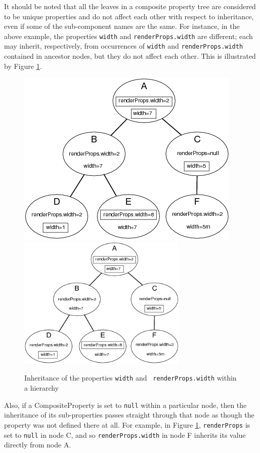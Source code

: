 \documentclass{article}
\begin{document}
It should be noted that all the leaves in a composite property tree
are considered to be unique properties and do not affect each other
with respect to inheritance, even if some of the sub-component names
are the same. For instance, in the above example, the properties 
{\tt width} and {\tt renderProps.width} are different; each may inherit,
respectively, from occurrences of {\tt width} and 
{\tt renderProps.width} contained in ancestor nodes, but they do not affect
each other. This is illustrated by Figure \ref{compositesFig}.

\begin{figure}
\begin{center}
\iflatexml
\includegraphics[]{images/composites}
\else
\includegraphics[height=2.5in]{images/composites}
\fi
\end{center}
\caption{Inheritance of the properties {\tt width} and {\tt
renderProps.width} within a hierarchy}%
\label{compositesFig}
\end{figure}

Also, if a CompositeProperty is set to {\tt null} within a particular
node, then the inheritance of its sub-properties passes straight
through that node as though the property was not defined there at
all. For example, in Figure \ref{compositesFig}, {\tt renderProps} is
set to {\tt null} in node C, and so {\tt renderProps.width} in node F
inherits its value directly from node A.
\end{document}
